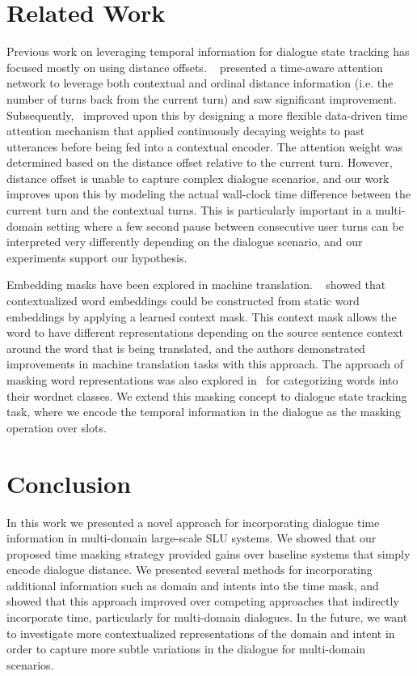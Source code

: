 \documentclass[11pt,a4paper]{article}
\begin{document}
\section{Related Work}
\label{sec:related}
Previous work on leveraging temporal information for dialogue state tracking has focused mostly on using distance offsets.
~\cite{chen2017dynamic} presented a time-aware attention network to leverage both contextual and ordinal distance information (i.e. the number of turns back from the current turn) and saw significant improvement.
Subsequently,~\cite{su2018time} improved upon this by designing a more flexible data-driven time attention mechanism that applied continuously decaying weights to past utterances before being fed into a contextual encoder.
The attention weight was determined based on the distance offset relative to the current turn.
However, distance offset is unable to capture complex dialogue scenarios, and our work improves upon this by modeling the actual wall-clock time difference between the current turn and the contextual turns.
This is particularly important in a multi-domain setting where a few second pause between consecutive user turns can be interpreted very differently depending on the dialogue scenario, and our experiments support our hypothesis.

Embedding masks have been explored in machine translation.
~\cite{context-mask} showed that contextualized word embeddings could be constructed from static word embeddings by applying a learned context mask.
This context mask allows the word to have different representations depending on the source sentence context around the word that is being translated, and the authors demonstrated improvements in machine translation tasks with this approach.
The approach of masking word representations was also explored in~\cite{ruseti2016using} for categorizing words into their wordnet classes.
We extend this masking concept to dialogue state tracking task, where we encode the temporal information in the dialogue as the masking operation over slots.
 
\section{Conclusion}
In this work we presented a novel approach for incorporating dialogue time information in multi-domain large-scale SLU systems.
We showed that our proposed time masking strategy provided gains over baseline systems that simply encode dialogue distance.
We presented several methods for incorporating additional information such as domain and intents into the time mask, and showed that this approach improved over competing approaches that indirectly incorporate time, particularly for multi-domain dialogues.
In the future, we want to investigate more contextualized representations of the domain and intent in order to capture more subtle variations in the dialogue for multi-domain scenarios.
 




\end{document}
